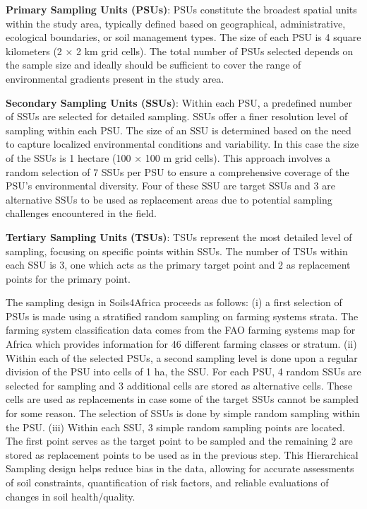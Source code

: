 \documentclass[
  10pt,
  b5paper,
  oneside]{book}
\begin{document}
\textbf{Primary Sampling Units (PSUs)}: PSUs constitute the broadest spatial units within the study area, typically defined based on geographical, administrative, ecological boundaries, or soil management types. The size of each PSU is 4 square kilometers (2 × 2 km grid cells). The total number of PSUs selected depends on the sample size and ideally should be sufficient to cover the range of environmental gradients present in the study area.

\textbf{Secondary Sampling Units (SSUs)}: Within each PSU, a predefined number of SSUs are selected for detailed sampling. SSUs offer a finer resolution level of sampling within each PSU. The size of an SSU is determined based on the need to capture localized environmental conditions and variability. In this case the size of the SSUs is 1 hectare (100 × 100 m grid cells). This approach involves a random selection of 7 SSUs per PSU to ensure a comprehensive coverage of the PSU's environmental diversity. Four of these SSU are target SSUs and 3 are alternative SSUs to be used as replacement areas due to potential sampling challenges encountered in the field.

\textbf{Tertiary Sampling Units (TSUs)}: TSUs represent the most detailed level of sampling, focusing on specific points within SSUs. The number of TSUs within each SSU is 3, one which acts as the primary target point and 2 as replacement points for the primary point.

The sampling design in Soils4Africa proceeds as follows: (i) a first selection of PSUs is made using a stratified random sampling on farming systems strata. The farming system classification data comes from the FAO farming systems map for Africa which provides information for 46 different farming classes or stratum. (ii) Within each of the selected PSUs, a second sampling level is done upon a regular division of the PSU into cells of 1 ha, the SSU. For each PSU, 4 random SSUs are selected for sampling and 3 additional cells are stored as alternative cells. These cells are used as replacements in case some of the target SSUs cannot be sampled for some reason. The selection of SSUs is done by simple random sampling within the PSU. (iii) Within each SSU, 3 simple random sampling points are located. The first point serves as the target point to be sampled and the remaining 2 are stored as replacement points to be used as in the previous step. This Hierarchical Sampling design helps reduce bias in the data, allowing for accurate assessments of soil constraints, quantification of risk factors, and reliable evaluations of changes in soil health/quality.
\end{document}
